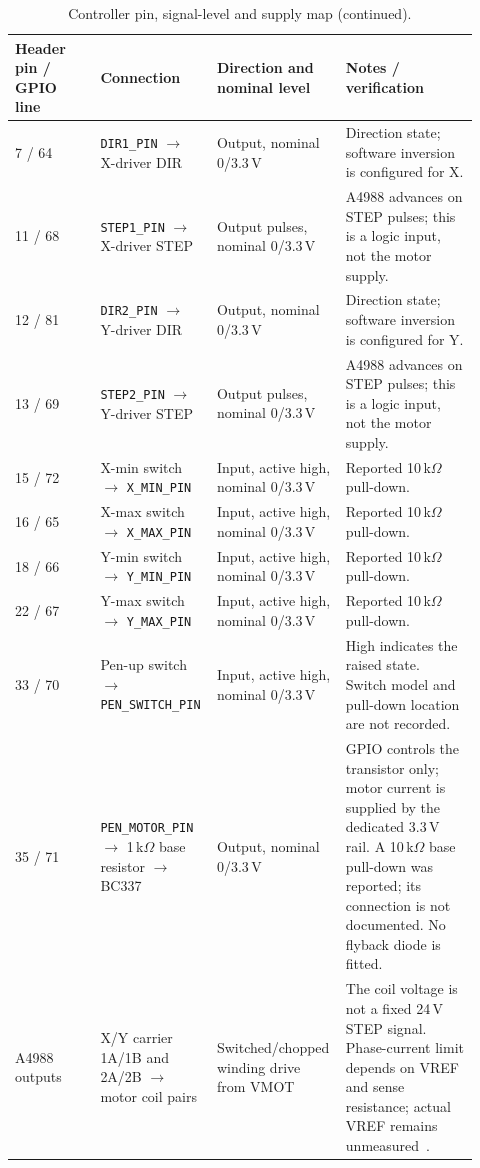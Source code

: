 \begin{table}[H]\ContinuedFloat\centering\small
\setlength{\tabcolsep}{3pt}\renewcommand{\arraystretch}{1.03}
\begin{tabular}{p{0.18\linewidth}p{0.22\linewidth}p{0.23\linewidth}p{0.29\linewidth}}\toprule
\textbf{Header pin / GPIO line} & \textbf{Connection} & \textbf{Direction and nominal level} & \textbf{Notes / verification}\\\midrule
7 / 64 & \texttt{DIR1\_PIN} $\rightarrow$ X-driver DIR & Output, nominal 0/3.3\,V & Direction state; software inversion is configured for X.\\
11 / 68 & \texttt{STEP1\_PIN} $\rightarrow$ X-driver STEP & Output pulses, nominal 0/3.3\,V & A4988 advances on STEP pulses; this is a logic input, not the motor supply.\\
12 / 81 & \texttt{DIR2\_PIN} $\rightarrow$ Y-driver DIR & Output, nominal 0/3.3\,V & Direction state; software inversion is configured for Y.\\
13 / 69 & \texttt{STEP2\_PIN} $\rightarrow$ Y-driver STEP & Output pulses, nominal 0/3.3\,V & A4988 advances on STEP pulses; this is a logic input, not the motor supply.\\
15 / 72 & X-min switch $\rightarrow$ \texttt{X\_MIN\_PIN} & Input, active high, nominal 0/3.3\,V & Reported 10\,k$\Omega$ pull-down.\\
16 / 65 & X-max switch $\rightarrow$ \texttt{X\_MAX\_PIN} & Input, active high, nominal 0/3.3\,V & Reported 10\,k$\Omega$ pull-down.\\
18 / 66 & Y-min switch $\rightarrow$ \texttt{Y\_MIN\_PIN} & Input, active high, nominal 0/3.3\,V & Reported 10\,k$\Omega$ pull-down.\\
22 / 67 & Y-max switch $\rightarrow$ \texttt{Y\_MAX\_PIN} & Input, active high, nominal 0/3.3\,V & Reported 10\,k$\Omega$ pull-down.\\
33 / 70 & Pen-up switch $\rightarrow$ \texttt{PEN\_SWITCH\_PIN} & Input, active high, nominal 0/3.3\,V & High indicates the raised state. Switch model and pull-down location are not recorded.\\
35 / 71 & \texttt{PEN\_MOTOR\_PIN} $\rightarrow$ 1\,k$\Omega$ base resistor $\rightarrow$ BC337 & Output, nominal 0/3.3\,V & GPIO controls the transistor only; motor current is supplied by the dedicated 3.3\,V rail. A 10\,k$\Omega$ base pull-down was reported; its connection is not documented. No flyback diode is fitted.\\
A4988 outputs & X/Y carrier 1A/1B and 2A/2B $\rightarrow$ motor coil pairs & Switched/chopped winding drive from VMOT & The coil voltage is not a fixed 24\,V STEP signal. Phase-current limit depends on VREF and sense resistance; actual VREF remains unmeasured~\cite[pp.~4--5, 9]{a4988ds}.\\
\bottomrule\end{tabular}
\caption{Controller pin, signal-level and supply map (continued).}
\end{table}
\FloatBarrier


\FloatBarrier
